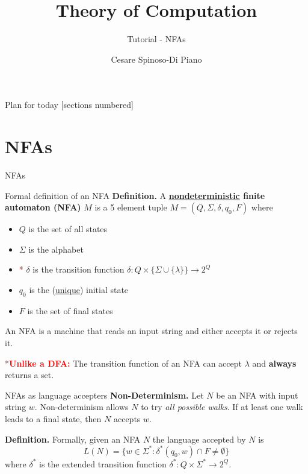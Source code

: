 \documentclass[10pt]{beamer}
\title{Theory of Computation}
\subtitle{Tutorial - NFAs}
\date{}
\author{Cesare Spinoso-Di Piano}
\begin{document}
\maketitle

\begin{frame}{Plan for today}
    [sections numbered]
    \tableofcontents[hideallsubsections]
\end{frame}


\section{NFAs}

\begin{frame}{NFAs}

\end{frame}

\begin{frame}[t]{Formal definition of an NFA}
    \textbf{Definition.} A \textbf{\underline{nondeterministic} finite automaton (NFA)} $M$ is a 5 element tuple $M = (Q, \Sigma, \delta, q_0, F)$ where
    \begin{itemize}
        \item $Q$ is the set of all states
        \item $\Sigma$ is the alphabet
        \item \textcolor{red}{*} $\delta$ is the transition function $\delta: Q \times \{\Sigma \cup \{\lambda\} \} \rightarrow 2^Q$
        \item $q_0$ is the (\underline{unique}) initial state
        \item $F$ is the set of final states
    \end{itemize}
    An NFA is a machine that reads an input string and either accepts it or rejects it.

    \textcolor{red}{*\textbf{Unlike a DFA: }}
    The transition function of an NFA can accept $\lambda$ and \textbf{always} returns a set.
\end{frame}


\begin{frame}{NFAs as language accepters}
    \textbf{Non-Determinism.} Let $N$ be an NFA with input string $w$. Non-determinism allows $N$ to try \textit{all possible walks}. If at least one walk leads to a final state, then $N$ accepts $w$.

    \textbf{Definition.} Formally, given an NFA $N$ the language accepted by $N$ is
    \[
        L(N) = \{w \in \Sigma ^*: \delta^*(q_0, w) \cap F \neq \emptyset\}
    \]
    where $\delta^*$ is the extended transition function $\delta^*: Q \times \Sigma^* \rightarrow 2^Q$.
\end{frame}
\end{document}
